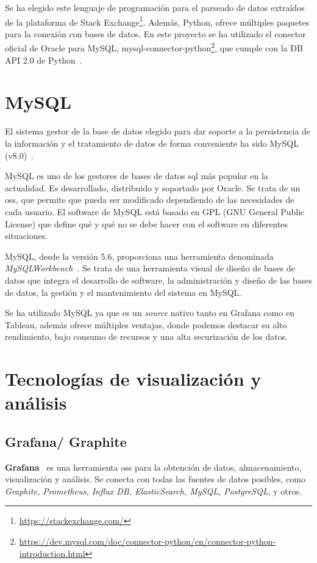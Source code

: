 \documentclass[a4paper, 12pt]{book}
\begin{document}
Se ha elegido este lenguaje de programación para el parseado de datos extraídos de la plataforma de Stack Exchange\footnote{\url{https://stackexchange.com/}}. Además, Python, ofrece múltiples paquetes para la conexión con bases de datos. En este proyecto se ha utilizado el conector oficial de Oracle para MySQL, mysql-connector-python\footnote{\url{https://dev.mysql.com/doc/connector-python/en/connector-python-introduction.html}}, que cumple con la DB API 2.0 de Python~\cite{Python}.

\section{MySQL} 
\label{sec:Mysql}

El sistema gestor de la base de datos elegido para dar soporte a la persistencia de la información y el tratamiento de datos de forma conveniente ha sido MySQL (v8.0)~\cite{MYSQL}.

MySQL es uno de los gestores de bases de datos \gls{sql} más popular en la actualidad. Es desarrollado, distribuido y soportado por Oracle. Se trata de un \gls{oss}, que permite que pueda ser modificado dependiendo de las necesidades de cada usuario. El software de MySQL está basado en GPL (GNU General Public License) que define qué y qué no se debe hacer con el software en diferentes situaciones.

MySQL, desde la versión 5.6, proporciona una herramienta denominada  \textit{MySQLWorkbench}~\cite{krogh2020mysql}. Se trata de una herramienta visual de diseño de bases de datos que integra el desarrollo de software, la administración y diseño de las bases de datos, la gestión y el mantenimiento del sistema en MySQL.

Se ha utilizado MySQL ya que es un \emph{source} nativo tanto en Grafana como en Tableau, además ofrece múltiples ventajas, donde podemos destacar su alto rendimiento, bajo consumo de recursos y una alta securización de los datos.

\section{Tecnologías de visualización y análisis} 
\label{sec:Tenologias_va}
\subsection{Grafana/ Graphite} 
\label{sec:Grafana} 

\textbf{Grafana}~\cite{chakraborty2021grafana} es una herramienta \gls{oss} para la obtención de datos, almacenamiento, visualización y análisis.
Se conecta con todas las fuentes de datos posibles, como \textit{Graphite, Prometheus, Influx DB, ElasticSearch, MySQL, PostgreSQL}, y otros.
\end{document}
